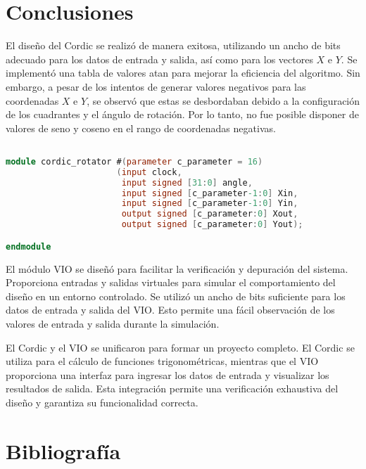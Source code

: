 \documentclass[12pt,a4paper, twoside]{article} %
\begin{document}
\newpage

\section{Conclusiones}

El diseño del Cordic se realizó de manera exitosa, utilizando un ancho de bits adecuado para los datos de entrada y salida, así como para los vectores $X$ e $Y$. Se implementó una tabla de valores atan para mejorar la eficiencia del algoritmo. Sin embargo, a pesar de los intentos de generar valores negativos para las coordenadas $X$ e $Y$, se observó que estas se desbordaban debido a la configuración de los cuadrantes y el ángulo de rotación. Por lo tanto, no fue posible disponer de valores de seno y coseno en el rango de coordenadas negativas.

\begin{lstlisting}[language=Verilog]

module cordic_rotator #(parameter c_parameter = 16)
                      (input clock,
                       input signed [31:0] angle,
                       input signed [c_parameter-1:0] Xin,
                       input signed [c_parameter-1:0] Yin,
                       output signed [c_parameter:0] Xout,
                       output signed [c_parameter:0] Yout);

endmodule
\end{lstlisting}


El módulo VIO se diseñó para facilitar la verificación y depuración del sistema. Proporciona entradas y salidas virtuales para simular el comportamiento del diseño en un entorno controlado. Se utilizó un ancho de bits suficiente para los datos de entrada y salida del VIO. Esto permite una fácil observación de los valores de entrada y salida durante la simulación.


El Cordic y el VIO se unificaron para formar un proyecto completo. El Cordic se utiliza para el cálculo de funciones trigonométricas, mientras que el VIO proporciona una interfaz para ingresar los datos de entrada y visualizar los resultados de salida. Esta integración permite una verificación exhaustiva del diseño y garantiza su funcionalidad correcta.

\newpage
\section{Bibliografía}
\end{document}
